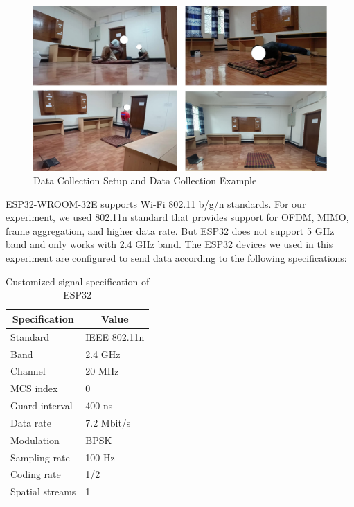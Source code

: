         \begin{figure}[H]
        \centering
        \includegraphics[width=1\textwidth]{./figure/chap 4/dataCollection.png}
        \caption{Data Collection Setup and Data Collection Example}
        \label{Fig 4.5}
        \end{figure}


ESP32-WROOM-32E supports Wi-Fi 802.11 b/g/n standards. For our experiment, we used 802.11n standard that provides support for OFDM, MIMO, frame aggregation, and higher data rate. But ESP32 does not support 5 GHz band and only works with 2.4 GHz band. The ESP32 devices we used in this experiment are configured to send data according to the following specifications:

\begin{table}[H]
\caption{Customized signal specification of ESP32}
\vspace{2mm}
\centering
\begin{tabular}{|l|l|} 
\hline
\multicolumn{1}{|c|}{\textbf{Specification}} & \multicolumn{1}{c|}{\textbf{Value}}                                                             \\ 
\hline
Standard               & IEEE 802.11n   \\
Band                   & 2.4 GHz        \\
Channel                & 20 MHz         \\
MCS index              & 0              \\
Guard interval         & 400 ns         \\
Data rate              & 7.2 Mbit/s     \\
Modulation             & BPSK           \\
Sampling rate          & 100 Hz         \\
Coding rate            & 1/2            \\
Spatial streams        & 1              \\
\hline

\end{tabular}
\label{Table 4.1}
\end{table}


